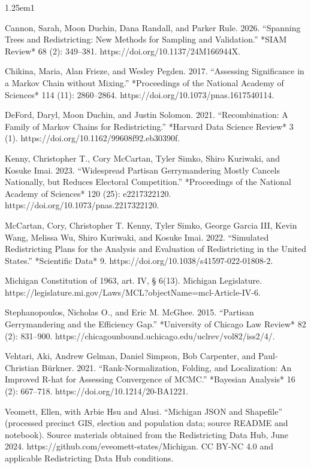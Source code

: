 \documentclass[
  10pt,
]{article}
\begin{document}
\begingroup\small
\setlength{\parindent}{0pt}
\setlength{\parskip}{5pt}
\begin{hangparas}{1.25em}{1}

Cannon, Sarah, Moon Duchin, Dana Randall, and Parker Rule. 2026. “Spanning Trees and Redistricting: New Methods for Sampling and Validation.” *SIAM Review* 68 (2): 349–381. https://doi.org/10.1137/24M166944X.

Chikina, Maria, Alan Frieze, and Wesley Pegden. 2017. “Assessing Significance in a Markov Chain without Mixing.” *Proceedings of the National Academy of Sciences* 114 (11): 2860–2864. https://doi.org/10.1073/pnas.1617540114.

DeFord, Daryl, Moon Duchin, and Justin Solomon. 2021. “Recombination: A Family of Markov Chains for Redistricting.” *Harvard Data Science Review* 3 (1). https://doi.org/10.1162/99608f92.eb30390f.

Kenny, Christopher T., Cory McCartan, Tyler Simko, Shiro Kuriwaki, and Kosuke Imai. 2023. “Widespread Partisan Gerrymandering Mostly Cancels Nationally, but Reduces Electoral Competition.” *Proceedings of the National Academy of Sciences* 120 (25): e2217322120. https://doi.org/10.1073/pnas.2217322120.

McCartan, Cory, Christopher T. Kenny, Tyler Simko, George Garcia III, Kevin Wang, Melissa Wu, Shiro Kuriwaki, and Kosuke Imai. 2022. “Simulated Redistricting Plans for the Analysis and Evaluation of Redistricting in the United States.” *Scientific Data* 9. https://doi.org/10.1038/s41597-022-01808-2.

Michigan Constitution of 1963, art. IV, § 6(13). Michigan Legislature. https://legislature.mi.gov/Laws/MCL?objectName=mcl-Article-IV-6.

Stephanopoulos, Nicholas O., and Eric M. McGhee. 2015. “Partisan Gerrymandering and the Efficiency Gap.” *University of Chicago Law Review* 82 (2): 831–900. https://chicagounbound.uchicago.edu/uclrev/vol82/iss2/4/.

Vehtari, Aki, Andrew Gelman, Daniel Simpson, Bob Carpenter, and Paul-Christian Bürkner. 2021. “Rank-Normalization, Folding, and Localization: An Improved R-hat for Assessing Convergence of MCMC.” *Bayesian Analysis* 16 (2): 667–718. https://doi.org/10.1214/20-BA1221.

Veomett, Ellen, with Arbie Hsu and Alusi. “Michigan JSON and Shapefile” (processed precinct GIS, election and population data; source README and notebook). Source materials obtained from the Redistricting Data Hub, June 2024. https://github.com/eveomett-states/Michigan. CC BY-NC 4.0 and applicable Redistricting Data Hub conditions.



\end{hangparas}
\endgroup
\end{document}
